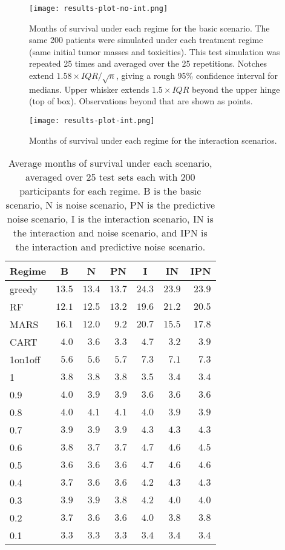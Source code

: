 \documentclass[12pt]{article}
\begin{document}
\begin{figure}[h]
\begin{center}
\texttt{[image: results-plot-no-int.png]}
\end{center}
\caption[Months of survival under scenarios without interaction]{Months of survival under each regime for the basic scenario. The same 200 patients were simulated under each treatment regime (same initial tumor masses and toxicities). This test simulation was  repeated 25 times and averaged over the 25 repetitions. Notches extend $1.58 \times IQR / \sqrt{n}$, giving a rough 95\% confidence interval for medians. Upper whisker extends $1.5 \times IQR$ beyond the upper hinge (top of box). Observations beyond that are shown as points.}
\label{fig:results-no-int}
\end{figure}

\begin{figure}[h]
\begin{center}
\texttt{[image: results-plot-int.png]}
\end{center}
\caption[Months of survival under scenarios with interaction]{Months of survival under each regime for the interaction scenarios.}
\label{fig:results-int}
\end{figure}

\begin{table}[h]
\caption[Average months of survival under each scenario]{Average months of survival under each scenario, averaged over 25 test sets each with 200 participants for each regime. B is the basic scenario, N is noise scenario, PN is the predictive noise scenario, I is the interaction scenario, IN is the interaction and noise scenario, and IPN is the interaction and predictive noise scenario.}
\begin{center}
\begin{tabular}{lrrrrrr}
\toprule
\multicolumn{1}{c}{Regime}&\multicolumn{1}{c}{B}&\multicolumn{1}{c}{N}&\multicolumn{1}{c}{PN}&\multicolumn{1}{c}{I}&\multicolumn{1}{c}{IN}&\multicolumn{1}{c}{IPN}\tabularnewline
\midrule
greedy&$13.5$&$13.4$&$13.7$&$24.3$&$23.9$&$23.9$\tabularnewline
RF&$12.1$&$12.5$&$13.2$&$19.6$&$21.2$&$20.5$\tabularnewline
MARS&$16.1$&$12.0$&$ 9.2$&$20.7$&$15.5$&$17.8$\tabularnewline
CART&$ 4.0$&$ 3.6$&$ 3.3$&$ 4.7$&$ 3.2$&$ 3.9$\tabularnewline
1on1off&$ 5.6$&$ 5.6$&$ 5.7$&$ 7.3$&$ 7.1$&$ 7.3$\tabularnewline
1&$ 3.8$&$ 3.8$&$ 3.8$&$ 3.5$&$ 3.4$&$ 3.4$\tabularnewline
0.9&$ 4.0$&$ 3.9$&$ 3.9$&$ 3.6$&$ 3.6$&$ 3.6$\tabularnewline
0.8&$ 4.0$&$ 4.1$&$ 4.1$&$ 4.0$&$ 3.9$&$ 3.9$\tabularnewline
0.7&$ 3.9$&$ 3.9$&$ 3.9$&$ 4.3$&$ 4.3$&$ 4.3$\tabularnewline
0.6&$ 3.8$&$ 3.7$&$ 3.7$&$ 4.7$&$ 4.6$&$ 4.5$\tabularnewline
0.5&$ 3.6$&$ 3.6$&$ 3.6$&$ 4.7$&$ 4.6$&$ 4.6$\tabularnewline
0.4&$ 3.7$&$ 3.6$&$ 3.6$&$ 4.2$&$ 4.3$&$ 4.3$\tabularnewline
0.3&$ 3.9$&$ 3.9$&$ 3.8$&$ 4.2$&$ 4.0$&$ 4.0$\tabularnewline
0.2&$ 3.7$&$ 3.6$&$ 3.6$&$ 4.0$&$ 3.8$&$ 3.8$\tabularnewline
0.1&$ 3.3$&$ 3.3$&$ 3.3$&$ 3.4$&$ 3.4$&$ 3.4$\tabularnewline
\bottomrule
\end{tabular}\end{center}
\end{table}
\end{document}
